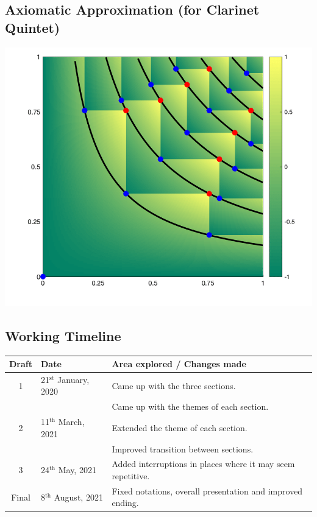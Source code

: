 \documentclass{article}
\begin{document}
\begin{center}
\vspace*{\fill}
\LARGE
    \section{Axiomatic Approximation (for Clarinet Quintet)}
    \includegraphics[width=\textwidth]{approximation.png}
\vspace*{\fill}
\end{center}
\newpage
\subsection{Working Timeline}


\begin{center}
	\def\arraystretch{1.5}
\begin{tabular}{|c|l|l|}
	\hline
	Draft&Date&Area explored / Changes made\\
	\hline
    1&21\(^\text{st}\) January, 2020&
    Came up with the three sections.\\
    &&Came up with the themes of each section.\\
	\hline
	2&11\(^\text{th}\) March, 2021&
    Extended the theme of each section.\\
    &&Improved transition between sections.\\
	\hline
	3&24\(^\text{th}\) May, 2021&
    Added interruptions in places where it may seem repetitive.\\
	\hline
	Final&8\(^\text{th}\) August, 2021&
    Fixed notations, overall presentation and improved ending.\\
	\hline
\end{tabular}
\end{center}
\end{document}
